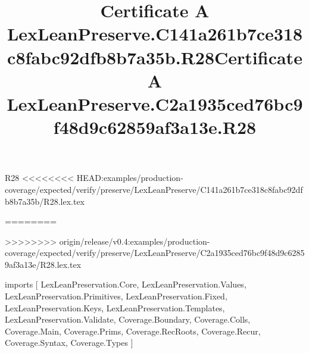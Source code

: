 \begin{lexlean}{R28}
<<<<<<<< HEAD:examples/production-coverage/expected/verify/preserve/LexLeanPreserve/C141a261b7ce318c8fabc92dfb8b7a35b/R28.lex.tex
\title{Certificate A LexLeanPreserve.C141a261b7ce318c8fabc92dfb8b7a35b.R28}
========
\title{Certificate A LexLeanPreserve.C2a1935ced76bc9f48d9c62859af3a13e.R28}
>>>>>>>> origin/release/v0.4:examples/production-coverage/expected/verify/preserve/LexLeanPreserve/C2a1935ced76bc9f48d9c62859af3a13e/R28.lex.tex
\begin{coremodule}
imports [
  LexLeanPreservation.Core,
  LexLeanPreservation.Values,
  LexLeanPreservation.Primitives,
  LexLeanPreservation.Fixed,
  LexLeanPreservation.Keys,
  LexLeanPreservation.Templates,
  LexLeanPreservation.Validate,
  Coverage.Boundary,
  Coverage.Colls,
  Coverage.Main,
  Coverage.Prims,
  Coverage.RecRoots,
  Coverage.Recur,
  Coverage.Syntax,
  Coverage.Types
]


\end{coremodule}
\end{lexlean}
